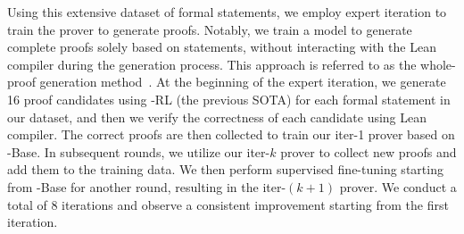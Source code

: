 Using this extensive dataset of formal statements, we employ expert iteration \citep{polu2022formal} to train the prover to generate proofs. Notably, we train a model to generate complete proofs solely based on statements, without interacting with the Lean compiler during the generation process. This approach is referred to as the whole-proof
generation method~\citep{jiang2022draft, wang2024theoremllama, xin2024deepseek, xin2024deepseekv15}.
At the beginning of the expert iteration, we generate 16 proof candidates using \dsprover-RL (the previous SOTA) for each formal statement in our dataset, and then we verify the correctness of each candidate using Lean compiler. The correct proofs are then collected to train our iter-1 prover based on \dsprover-Base.
In subsequent rounds, we utilize our iter-\( k \) prover to collect new proofs and add them to the training data. We then perform supervised fine-tuning starting from \dsprover-Base for another round, resulting in the iter-\( (k+1) \) prover.
We conduct a total of 8 iterations and observe a consistent improvement starting from the first iteration.



